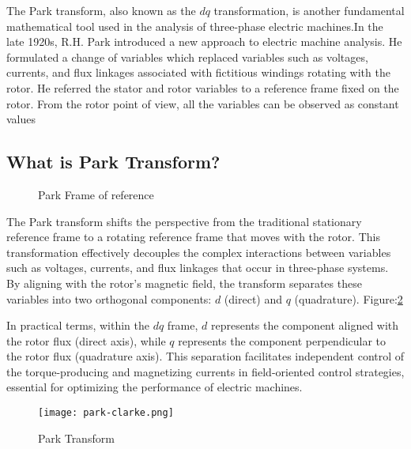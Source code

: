 The Park transform, also known as the \( dq \) transformation, is another
fundamental mathematical tool used in the analysis of three-phase electric
machines.In the late 1920s, R.H. Park\cite{R. H. Park} introduced a new
approach to electric machine analysis. He formulated a change of variables
which replaced variables such as voltages, currents, and flux linkages
associated with fictitious windings rotating with the rotor. He referred the
stator and rotor variables to a reference frame fixed on the rotor. From the
rotor point of view, all the variables can be observed as constant values
\subsection{What is Park Transform?}
\begin{figure}[ht]
    \centering
    \caption{Park Frame of reference}
    \label{Park Frame of reference}
\end{figure}
The Park transform shifts the perspective from the traditional stationary
reference frame to a rotating reference frame that moves with the rotor. This
transformation effectively decouples the complex interactions between variables
such as voltages, currents, and flux linkages that occur in three-phase
systems. By aligning with the rotor's magnetic field, the transform separates
these variables into two orthogonal components: \( d \) (direct) and \( q \)
(quadrature). Figure:\ref{fig:Park Transform}

In practical terms, within the \( dq \) frame, \( d \) represents the component
aligned with the rotor flux (direct axis), while \( q \) represents the
component perpendicular to the rotor flux (quadrature axis). This separation
facilitates independent control of the torque-producing and magnetizing
currents in field-oriented control strategies, essential for optimizing the
performance of electric machines.
\begin{figure}[h]
    \centering
    \texttt{[image: park-clarke.png]}
    \caption{Park Transform}
    \label{fig:Park Transform}
\end{figure}

